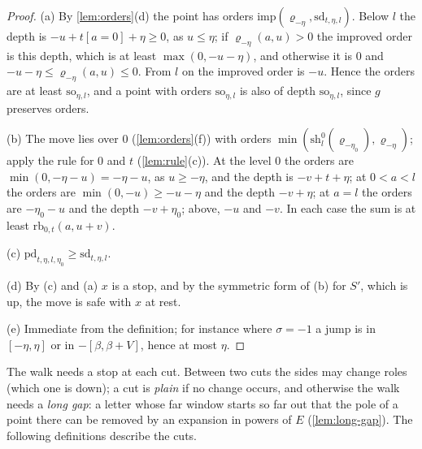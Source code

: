 \begin{proof}
(a) By \cref{lem:orders}(d) the point has orders $\mathrm{imp}(\varrho_{-\eta},\mathrm{sd}_{t,\eta,l})$. Below $l$ the depth is $-u+t[a=0]+\eta\ge0$, as $u\le\eta$; if $\varrho_{-\eta}(a,u)>0$ the improved order is this depth, which is at least $\max(0,-u-\eta)$, and otherwise it is $0$ and $-u-\eta\le\varrho_{-\eta}(a,u)\le0$. From $l$
on the improved order is $-u$. Hence the orders are at least $\mathrm{so}_{\eta,l}$, and a point with orders $\mathrm{so}_{\eta,l}$ is also of depth $\mathrm{so}_{\eta,l}$, since $g$ preserves orders.

(b) The move lies over $0$ (\cref{lem:orders}(f)) with orders $\min(\mathrm{sh}^0_l(\varrho_{-\eta_0}),\varrho_{-\eta})$; apply the rule for $0$ and $t$ (\cref{lem:rule}(c)). At the level $0$ the orders are $\min(0,-\eta-u)=-\eta-u$, as $u\ge-\eta$, and the depth is $-v+t+\eta$; at $0<a<l$ the orders are $\min(0,-u)\ge-u-\eta$ and the depth
$-v+\eta$; at $a=l$ the orders are $-\eta_0-u$ and the depth $-v+\eta_0$; above, $-u$ and $-v$. In each case the sum is at least $\mathrm{rb}_{0,t}(a,u+v)$.

(c) $\mathrm{pd}_{t,\eta,l,\eta_0}\ge\mathrm{sd}_{t,\eta,l}$.

(d) By (c) and (a) $x$ is a stop, and by the symmetric form of (b) for $S'$, which is up, the move is safe with $x$ at rest.

(e) Immediate from the definition; for instance where $\sigma=-1$ a jump is in $[-\eta,\eta]$ or in $-[\beta,\beta+V]$, hence at most $\eta$.
\end{proof}

The walk needs a stop at each cut. Between two cuts the sides may change roles (which one is down); a cut is \emph{plain} if no change occurs, and otherwise the walk needs a \emph{long gap}: a letter whose far window starts so far out that the
pole of a point there can be removed by an expansion in powers of $E$ (\cref{lem:long-gap}). The following definitions describe the cuts.

